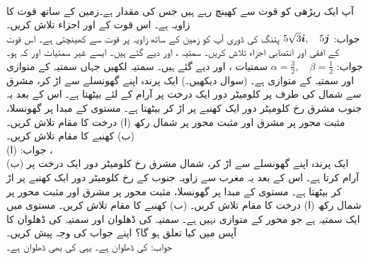 \\
آپ ایک ریڑھی کو قوت  سے کھینچ رہے ہیں جس کی مقدار  ہے۔زمین کے ساتھ قوت کا زاویہ  ہے۔ اس قوت کے  اور  اجزاء تلاش کریں۔\\
جواب:\quad
$5\sqrt{3}{\boldsymbol{i}},\quad 5{\boldsymbol{j}}$
پتنگ کی ڈوری آپ کو زمین کے ساتھ  زاویہ پر  قوت سے کھینچتی ہے۔ اس قوت کے افقی اور انتصابی اجزاء تلاش کریں۔
سمتیہ ،  اور  دیے گئے ہیں۔ ایسے غیر سمتیات  اور  کہ  ہو۔\\
جواب:\quad
$\alpha=\tfrac{3}{2},\quad \beta=\tfrac{1}{2}$
سمتیات ،  اور  دیے گئے ہیں۔ سمتیہ  لکھیں جہاں  سمتیہ  کے متوازی اور  سمتیہ  کے متوازی ہے۔ (سوال  دیکھیں۔)
 ایک پرندہ اپنے گھونسلے سے اڑ کر، مشرق سے شمال کی طرف  پر   کلومیٹر دور ایک درخت پر آرام کے لئے بیٹھتا ہے۔ اس کے بعد یہ جنوب مشرق رخ  کلومیٹر دور ایک کھنبے پر اڑ کر  بیٹھتا ہے۔ مستوی  کے مبدا پر گھونسلا، مثبت  محور پر مشرق اور مثبت  محور پر شمال  رکھ (ا) درخت کا مقام تلاش کریں۔ (ب) کھنبے کا مقام تلاش کریں۔\\
جواب:\quad
(ا) ،\\
 (ب) 
 ایک پرندہ اپنے گھونسلے سے اڑ کر، شمال مشرق رخ  کلومیٹر دور ایک درخت پر آرام کرتا ہے۔ اس کے بعد یہ مغرب سے   زاویہ جنوب کے رخ  کلومیٹر دور ایک کھنبے پر اڑ کر بیٹھتا ہے۔ مستوی  کے مبدا پر گھونسلا، مثبت  محور پر مشرق اور مثبت  محور پر شمال  رکھ (ا) درخت کا مقام تلاش کریں۔ (ب) کھنبے کا مقام تلاش کریں۔
مستوی میں  ایک سمتیہ ہے جو  محور کے متوازی نہیں ہے۔ سمتیہ  کی ڈھلوان اور سمتیہ  کی ڈھلوان کا آپس میں کیا تعلق ہو گا؟ اپنے جواب کی وجہ پیش کریں۔\\
جواب:\quad
{} کی ڈھلوان  ہے۔ یہی  کی بھی ڈھلوان ہے۔

